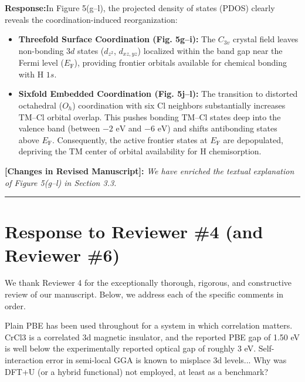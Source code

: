 \documentclass[11pt, sans, a4paper]{moderncv}
\newcommand{\response}{\vspace{0.4em}\noindent\textbf{\color{actionblue}Response:}\hspace{0.5em}}
\newcommand{\manuscriptchange}[1]{\vspace{0.3em}\noindent\textbf{\color{acsblue}[Changes in Revised Manuscript]:} \textit{#1}\vspace{0.4em}}
\begin{document}
\response In Figure 5(g--l), the projected density of states (PDOS) clearly reveals the coordination-induced reorganization:
\begin{itemize}[leftmargin=1.5em, itemsep=0.2em]
    \item \textbf{Threefold Surface Coordination (Fig. 5g--i):} The $C_{3v}$ crystal field leaves non-bonding $3d$ states ($d_{z^2}$, $d_{xz,yz}$) localized within the band gap near the Fermi level ($E_{\mathrm{F}}$), providing frontier orbitals available for chemical bonding with H $1s$.
    \item \textbf{Sixfold Embedded Coordination (Fig. 5j--l):} The transition to distorted octahedral ($O_h$) coordination with six Cl neighbors substantially increases $\text{TM--Cl}$ orbital overlap. This pushes bonding $\text{TM--Cl}$ states deep into the valence band (between $-2\text{ eV}$ and $-6\text{ eV}$) and shifts antibonding states above $E_{\mathrm{F}}$. Consequently, the active frontier states at $E_{\mathrm{F}}$ are depopulated, depriving the TM center of orbital availability for H chemisorption.
\end{itemize}

\manuscriptchange{We have enriched the textual explanation of Figure 5(g--l) in Section 3.3.}

\vspace{1.5em}
\noindent\rule{\textwidth}{0.6pt}

\newpage

\section{Response to Reviewer \#4 (and Reviewer \#6)}

\noindent We thank Reviewer 4 for the exceptionally thorough, rigorous, and constructive review of our manuscript. Below, we address each of the specific comments in order.

\begin{reviewercomment}
Plain PBE has been used throughout for a system in which correlation matters. CrCl3 is a correlated 3d magnetic insulator, and the reported PBE gap of 1.50 eV is well below the experimentally reported optical gap of roughly 3 eV. Self-interaction error in semi-local GGA is known to misplace 3d levels... Why was DFT+U (or a hybrid functional) not employed, at least as a benchmark?
\end{reviewercomment}
\end{document}
